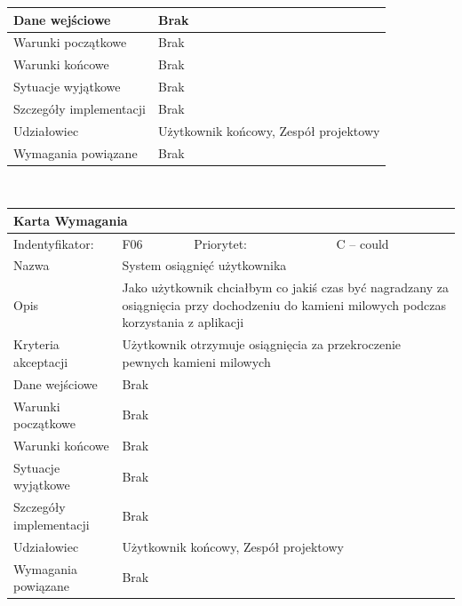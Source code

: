 \documentclass[a4paper,11pt]{report}
\begin{document}
\begin{itemize}
\begin{tabular}{|p{3cm}|p{2cm}|p{2cm}|p{6cm}|}
		\hline
		Dane wejściowe & \multicolumn{3}{|p{10 cm}|}{Brak}\\
		\hline
		Warunki początkowe & \multicolumn{3}{|p{10 cm}|}{Brak}\\
		\hline
		Warunki końcowe & \multicolumn{3}{|p{10 cm}|}{Brak}\\
		\hline
		Sytuacje wyjątkowe & \multicolumn{3}{|p{10 cm}|}{Brak}\\
		\hline
		Szczegóły implementacji & \multicolumn{3}{|p{10 cm}|}{Brak}\\
		\hline
		Udziałowiec & \multicolumn{3}{|p{10 cm}|}{Użytkownik końcowy, Zespół projektowy}\\
		\hline
		Wymagania powiązane & \multicolumn{3}{|p{10 cm}|}{Brak}\\
		\hline
		\end{tabular}\\
		\begin{tabular}{|p{3cm}|p{2cm}|p{2cm}|p{6cm}|}
		\hline
		\multicolumn{4}{|p{12 cm}|}{Karta Wymagania}\\
		\hline
		Indentyfikator: & F06 & Priorytet: & C – could \\
		\hline
		Nazwa & \multicolumn{3}{|p{10 cm}|}{System osiągnięć użytkownika}\\
		\hline
		Opis & \multicolumn{3}{|p{10 cm}|}{Jako użytkownik chciałbym co jakiś czas być nagradzany za osiągnięcia przy dochodzeniu do kamieni milowych podczas korzystania z aplikacji}\\
		\hline
		Kryteria akceptacji & \multicolumn{3}{|p{10 cm}|}{Użytkownik otrzymuje osiągnięcia za przekroczenie pewnych kamieni milowych}\\
		\hline
		Dane wejściowe & \multicolumn{3}{|p{10 cm}|}{Brak}\\
		\hline
		Warunki początkowe & \multicolumn{3}{|p{10 cm}|}{Brak}\\
		\hline
		Warunki końcowe & \multicolumn{3}{|p{10 cm}|}{Brak}\\
		\hline
		Sytuacje wyjątkowe & \multicolumn{3}{|p{10 cm}|}{Brak}\\
		\hline
		Szczegóły implementacji & \multicolumn{3}{|p{10 cm}|}{Brak}\\
		\hline
		Udziałowiec & \multicolumn{3}{|p{10 cm}|}{Użytkownik końcowy, Zespół projektowy}\\
		\hline
		Wymagania powiązane & \multicolumn{3}{|p{10 cm}|}{Brak}\\
		\hline
		\end{tabular}\\
		\begin{tabular}{|p{3cm}|p{2cm}|p{2cm}|p{6cm}|}

\end{tabular}
\end{itemize}
\end{document}
